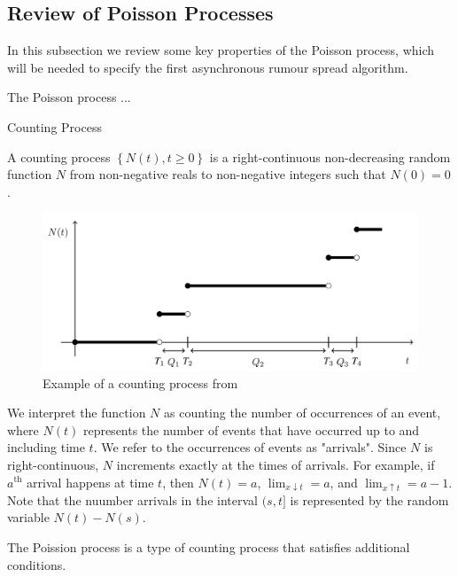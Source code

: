 \subsection{Review of Poisson Processes}

In this subsection we review some key properties of the Poisson process, which will be needed to specify the first asynchronous rumour spread algorithm.

The Poisson process ...
\begin{definition}
	Counting Process

	\noindent
	A counting process $\left\{ N(t), t \geq 0 \right\}$ is a right-continuous non-decreasing random function $N$ from non-negative reals to non-negative integers such that $N(0) = 0$.
\end{definition}

\begin{figure}[h]
	\centering
	\includegraphics[width=\textwidth]{./figures/poisson_process_example.png}
	\caption{Example of a counting process from \cite{countingProcessFigure}}
	\label{fig:poissonProcessExample}
\end{figure}


We interpret the function $N$ as counting the number of occurrences of an event, where $N(t)$ represents the number of events that have occurred up to and including time $t$. We refer to the occurrences of events as "arrivals".  Since $N$ is right-continuous, $N$ increments exactly at the times of arrivals. For example, if $a^\text{th}$ arrival happens at time $t$, then $N(t) = a$, $\lim_{x \downarrow t} = a$, and $\lim_{x \uparrow t} = a - 1$. Note that the nuumber arrivals in the interval $(s, t]$ is represented by the random variable $N(t) - N(s)$. 

The Poission process is a type of counting process that satisfies additional conditions. 

